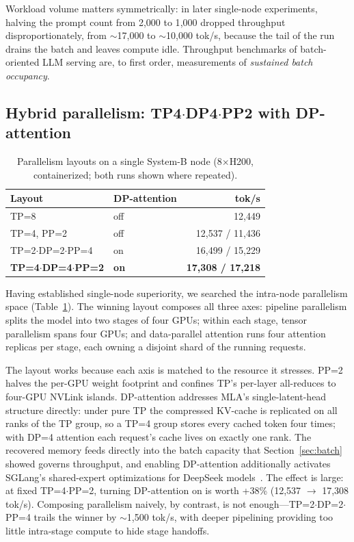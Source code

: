\documentclass[sigconf]{acmart}
\begin{document}
Workload volume matters symmetrically: in later single-node experiments, halving the prompt count from 2{,}000 to 1{,}000 dropped throughput disproportionately, from $\sim$17{,}000 to $\sim$10{,}000 tok/s, because the tail of the run drains the batch and leaves compute idle. Throughput benchmarks of batch-oriented LLM serving are, to first order, measurements of \emph{sustained batch occupancy}.

\subsection{Hybrid parallelism: TP4$\cdot$DP4$\cdot$PP2 with DP-attention}
\label{sec:hybrid}
\begin{table}
\caption{Parallelism layouts on a single System-B node (8$\times$H200, containerized; both runs shown where repeated).}
\label{tab:hybrid}
\small
\begin{tabular}{@{}llr@{}}
\toprule
\textbf{Layout} & \textbf{DP-attention} & \textbf{tok/s} \\
\midrule
TP=8 & off & 12{,}449 \\
TP=4, PP=2 & off & 12{,}537 / 11{,}436 \\
TP=2$\cdot$DP=2$\cdot$PP=4 & on & 16{,}499 / 15{,}229 \\
\textbf{TP=4$\cdot$DP=4$\cdot$PP=2} & \textbf{on} & \textbf{17{,}308 / 17{,}218} \\
\bottomrule
\end{tabular}
\end{table}

Having established single-node superiority, we searched the intra-node parallelism space (Table~\ref{tab:hybrid}). The winning layout composes all three axes: pipeline parallelism splits the model into two stages of four GPUs; within each stage, tensor parallelism spans four GPUs; and data-parallel attention runs four attention replicas per stage, each owning a disjoint shard of the running requests.

The layout works because each axis is matched to the resource it stresses. PP=2 halves the per-GPU weight footprint and confines TP's per-layer all-reduces to four-GPU NVLink islands. DP-attention addresses MLA's single-latent-head structure directly: under pure TP the compressed KV-cache is replicated on all ranks of the TP group, so a TP=4 group stores every cached token four times; with DP=4 attention each request's cache lives on exactly one rank. The recovered memory feeds directly into the batch capacity that Section~\ref{sec:batch} showed governs throughput, and enabling DP-attention additionally activates SGLang's shared-expert optimizations for DeepSeek models~\cite{sglangv04blog}. The effect is large: at fixed TP=4$\cdot$PP=2, turning DP-attention on is worth +38\% (12{,}537 $\rightarrow$ 17{,}308 tok/s). Composing parallelism naively, by contrast, is not enough---TP=2$\cdot$DP=2$\cdot$PP=4 trails the winner by $\sim$1{,}500 tok/s, with deeper pipelining providing too little intra-stage compute to hide stage handoffs.
\end{document}
